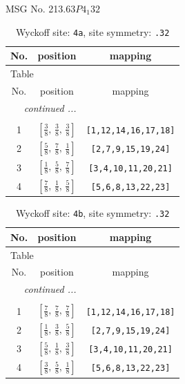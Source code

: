 \documentclass[fleqn,8pt]{jsarticle}
\begin{document}
\setcounter{MaxMatrixCols}{32}

\renewcommand{\tablename}{Table~}
\renewcommand{\figurename}{Figure~}
\begin{center}
\LARGE
MSG No. 213.63\quad$P4_{1}32$
\end{center}
\renewcommand{\arraystretch}{1.2}
\begin{longtable}{ccc}
\caption{Wyckoff site: {\tt 4a}, site symmetry: {\tt .32}}
 \\
 \hline \hline
No. & position & mapping \\ \hline \endfirsthead

\multicolumn{2}{l}{\tablename\ \thetable{}} \\
 \hline \hline
No. & position & mapping \\ \hline \endhead

 \hline \hline
\multicolumn{2}{r}{\footnotesize\it continued ...} \\ \endfoot

 \hline \hline
\multicolumn{2}{r}{} \\ \endlastfoot

1 & $\left[ \frac{3}{8},\, \frac{3}{8},\, \frac{3}{8} \right]$ & {\tt [1,12,14,16,17,18]} \\ \hline
2 & $\left[ \frac{5}{8},\, \frac{7}{8},\, \frac{1}{8} \right]$ & {\tt [2,7,9,15,19,24]} \\ \hline
3 & $\left[ \frac{1}{8},\, \frac{5}{8},\, \frac{7}{8} \right]$ & {\tt [3,4,10,11,20,21]} \\ \hline
4 & $\left[ \frac{7}{8},\, \frac{1}{8},\, \frac{5}{8} \right]$ & {\tt [5,6,8,13,22,23]} \\
\end{longtable}
\renewcommand{\arraystretch}{1.2}
\begin{longtable}{ccc}
\caption{Wyckoff site: {\tt 4b}, site symmetry: {\tt .32}}
 \\
 \hline \hline
No. & position & mapping \\ \hline \endfirsthead

\multicolumn{2}{l}{\tablename\ \thetable{}} \\
 \hline \hline
No. & position & mapping \\ \hline \endhead

 \hline \hline
\multicolumn{2}{r}{\footnotesize\it continued ...} \\ \endfoot

 \hline \hline
\multicolumn{2}{r}{} \\ \endlastfoot

1 & $\left[ \frac{7}{8},\, \frac{7}{8},\, \frac{7}{8} \right]$ & {\tt [1,12,14,16,17,18]} \\ \hline
2 & $\left[ \frac{1}{8},\, \frac{3}{8},\, \frac{5}{8} \right]$ & {\tt [2,7,9,15,19,24]} \\ \hline
3 & $\left[ \frac{5}{8},\, \frac{1}{8},\, \frac{3}{8} \right]$ & {\tt [3,4,10,11,20,21]} \\ \hline
4 & $\left[ \frac{3}{8},\, \frac{5}{8},\, \frac{1}{8} \right]$ & {\tt [5,6,8,13,22,23]} \\
\end{longtable}
\end{document}
